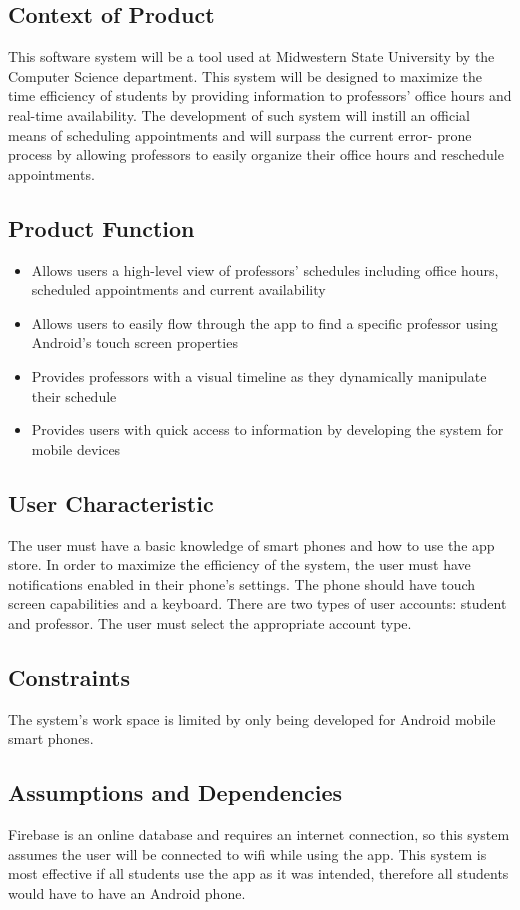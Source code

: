 \documentclass{article}
\begin{document}
  \subsection{Context of Product} 
  This software system will be a tool used at Midwestern State University by the Computer Science 
  department. This system will be designed to maximize the time efficiency of students by providing 
  information to professors' office hours and real-time availability. The development of such 
  system will instill an official means of scheduling appointments and will surpass the current error-
  prone process by allowing professors to easily organize their office hours and reschedule appointments.
  \subsection{Product Function}  
  \begin{itemize}
    \item Allows users a high-level view of professors' schedules including office hours, scheduled appointments
          and current availability
    \item Allows users to easily flow through the app to find a specific professor using Android's touch screen properties
    \item Provides professors with a visual timeline as they dynamically manipulate their schedule 
    \item Provides users with quick access to information by developing the system for mobile devices
  \end{itemize}
  \subsection{User Characteristic}
  The user must have a basic knowledge of smart phones and how to use the app store. In order to maximize 
  the efficiency of the system, the user must have notifications enabled in their phone's settings. The 
  phone should have touch screen capabilities and a keyboard. There are two types of user accounts: student
  and professor. The user must select the appropriate account type.
  \subsection{Constraints}
  The system's work space is limited by only being developed for Android mobile smart phones. 
  \subsection{Assumptions and Dependencies}
  Firebase is an online database and requires an internet connection, so this system assumes the user
  will be connected to wifi while using the app. This system is most effective if all students use the
  app as it was intended, therefore all students would have to have an Android phone. 
\end{document}

